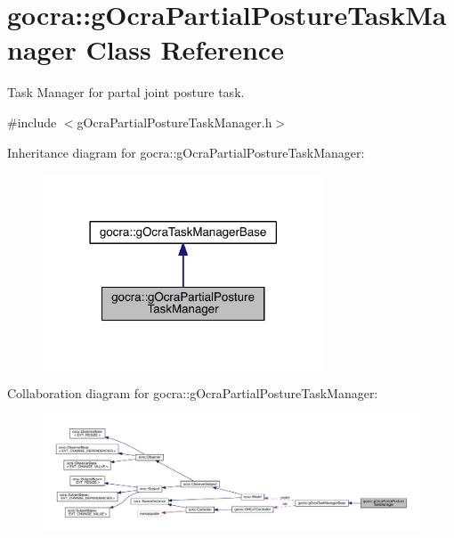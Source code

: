 \hypertarget{classgocra_1_1gOcraPartialPostureTaskManager}{}\section{gocra\+:\+:g\+Ocra\+Partial\+Posture\+Task\+Manager Class Reference}
\label{classgocra_1_1gOcraPartialPostureTaskManager}


Task Manager for partal joint posture task.  




{\ttfamily \#include $<$g\+Ocra\+Partial\+Posture\+Task\+Manager.\+h$>$}



Inheritance diagram for gocra\+:\+:g\+Ocra\+Partial\+Posture\+Task\+Manager\+:\nopagebreak
\begin{figure}[H]
\begin{center}
\leavevmode
\includegraphics[width=237pt]{d1/d79/classgocra_1_1gOcraPartialPostureTaskManager__inherit__graph}
\end{center}
\end{figure}


Collaboration diagram for gocra\+:\+:g\+Ocra\+Partial\+Posture\+Task\+Manager\+:\nopagebreak
\begin{figure}[H]
\begin{center}
\leavevmode
\includegraphics[width=350pt]{de/d94/classgocra_1_1gOcraPartialPostureTaskManager__coll__graph}
\end{center}
\end{figure}
